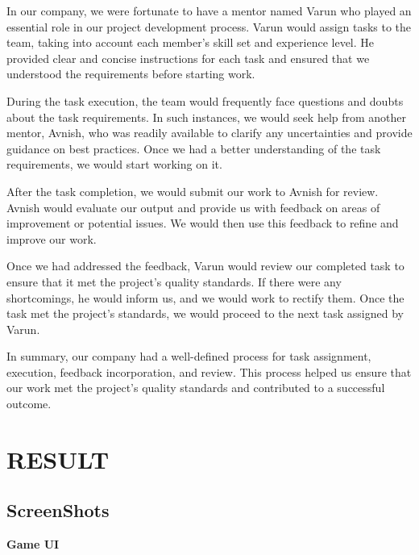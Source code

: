 \documentclass[12pt]{report}
\begin{document}
In our company, we were fortunate to have a mentor named Varun who played an essential role in our project development process. Varun would assign tasks to the team, taking into account each member's skill set and experience level. He provided clear and concise instructions for each task and ensured that we understood the requirements before starting work.

During the task execution, the team would frequently face questions and doubts about the task requirements. In such instances, we would seek help from another mentor, Avnish, who was readily available to clarify any uncertainties and provide guidance on best practices. Once we had a better understanding of the task requirements, we would start working on it.

After the task completion, we would submit our work to Avnish for review. Avnish would evaluate our output and provide us with feedback on areas of improvement or potential issues. We would then use this feedback to refine and improve our work.

Once we had addressed the feedback, Varun would review our completed task to ensure that it met the project's quality standards. If there were any shortcomings, he would inform us, and we would work to rectify them. Once the task met the project's standards, we would proceed to the next task assigned by Varun.

In summary, our company had a well-defined process for task assignment, execution, feedback incorporation, and review. This process helped us ensure that our work met the project's quality standards and contributed to a successful outcome.

\clearpage


\centering


\centering
\section{RESULT}

\justifying
\setlength{\parindent}{4em}
\setlength{\parskip}{0.5em}
\renewcommand{\baselinestretch}{1.5}
\vspace{1cm}
\subsection{ScreenShots}
\textbf{Game UI}
\end{document}
